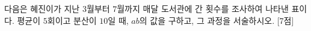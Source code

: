 다음은 혜진이가 지난 $3$월부터 $7$월까지 매달 도서관에 간 횟수를 조사하여 나타낸 표이다. 평균이 $5$회이고 분산이 $10$일 때, $ab$의 값을 구하고, 그 과정을 서술하시오. \mbox{[7점]}\par\smallskip{}
